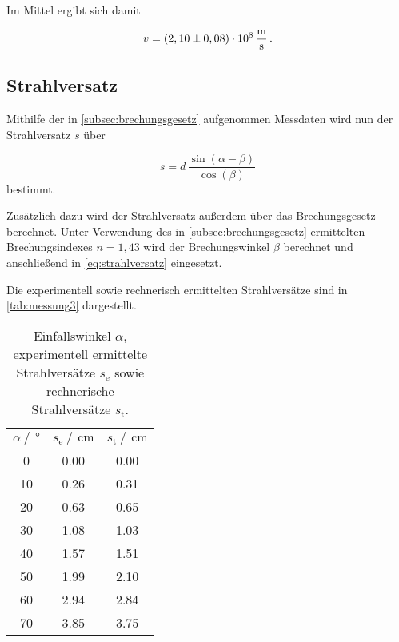 Im Mittel ergibt sich damit

\begin{equation*}
    v = (2,10 \pm 0,08) \cdot 10^8 \,\unit{\frac{\meter}{\second}} \,.
\end{equation*} 


\subsection{Strahlversatz}

Mithilfe der in \autoref{subsec:brechungsgesetz} aufgenommen Messdaten wird nun der Strahlversatz $s$ über 

\begin{equation}
    s = d \,\frac{\sin(\alpha - \beta)}{\cos(\beta)}
    \label{eq:strahlversatz}
\end{equation}
bestimmt.

Zusätzlich dazu wird der Strahlversatz außerdem über das Brechungsgesetz berechnet.
Unter Verwendung des in \autoref{subsec:brechungsgesetz} ermittelten Brechungsindexes $n = 1,43$ wird der Brechungswinkel $\beta$ berechnet und anschließend in \eqref{eq:strahlversatz} eingesetzt.

Die experimentell sowie rechnerisch ermittelten Strahlversätze sind in \autoref{tab:messung3} dargestellt.

\begin{table}[H]
    \centering
    \caption{Einfallswinkel $\alpha$, experimentell ermittelte Strahlversätze $s_{\text{e}}$ sowie rechnerische Strahlversätze $s_{\text{t}}$.}
    \label{tab:messung3}
    \begin{tabular}{S[table-format=2.0] S[table-format=1.2] S[table-format=1.2]}
      \toprule
        {$\alpha \mathbin{/} \, \unit{\degree}$} & {$ s_{\text{e}} \mathbin{/} \, \unit{\centi\meter}$} & {$ s_{\text{t}} \mathbin{/} \, \unit{\centi\meter}$} \\
                &       0.00     &   0.00  \\
      10          &       0.26     &   0.31  \\
      20          &       0.63     &   0.65  \\
      30          &       1.08     &   1.03  \\
      40          &       1.57     &   1.51  \\
      50          &       1.99     &   2.10  \\
      60          &       2.94     &   2.84  \\
      70          &       3.85     &   3.75  \\
    \bottomrule
    \end{tabular}
\end{table}



